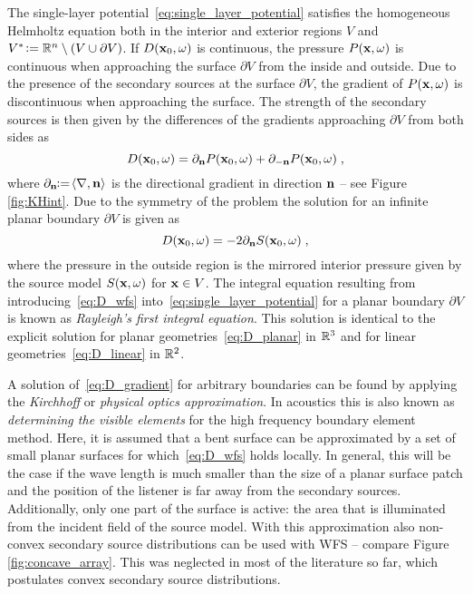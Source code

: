 The single-layer potential~\eqref{eq:single_layer_potential} satisfies the homogeneous
Helmholtz equation
both in the interior and exterior regions $V$ and $V^*
\mathrel{\!\mathop:}= \mathbb{R}^n \setminus (V \cup \partial V)$.  If $D(\mathbf{x}_0,\omega)$ is
continuous, the pressure $P(\mathbf{x},\omega)$ is continuous when approaching the
surface $\partial V$ from the inside and outside.  Due to the presence of the
secondary sources at the surface $\partial V$, the gradient of $P(\mathbf{x},\omega)$ is
discontinuous when approaching the surface.
The strength of the secondary sources is then given by the differences of the
gradients approaching $\partial V$ from both sides
as 
%
\begin{equation}
    D(\x_0,\omega) = \partial_\n
    P(\x_0,\omega) + \partial_{-\n} P(\x_0,\omega)\qc
    \label{eq:D_gradient}
\end{equation}
%
where
$\partial_{\mathbf{n}}\!\mathrel{\!\mathop:}=\!\langle\nabla,\mathbf{n}\rangle$ is the directional gradient
in direction $\mathbf{n}$ -- see Figure\,\ref{fig:KHint}.
Due to the symmetry of the problem the solution for an infinite planar
boundary $\partial V$ is given as 
%
\begin{equation}
    D(\x_0,\omega) = -2 \partial_\n S(\x_0,\omega)\qc
    \label{eq:D_wfs}
\end{equation}
%
where the pressure in the outside region is the mirrored interior pressure given by the
source model $S(\mathbf{x},\omega)$ for $\mathbf{x} \in V$.  The
integral equation resulting from introducing~\eqref{eq:D_wfs}
into~\eqref{eq:single_layer_potential} for a planar boundary $\partial V$ is known as
{\em Rayleigh's first integral equation}. This solution is identical
to the explicit solution for planar geometries~\eqref{eq:D_planar} in $\mathbb{R}^3$ and for
linear geometries~\eqref{eq:D_linear} in $\mathbb{R}^2$.

A solution of~\eqref{eq:D_gradient} for  arbitrary boundaries can be
found by applying the \emph{Kirchhoff} or \emph{physical optics
approximation}.
In acoustics this is also known as \emph{determining the visible elements} for
the high frequency boundary element
method.
Here, it is assumed that a
bent surface can be approximated by a set of small planar surfaces for
which~\eqref{eq:D_wfs} holds locally.  In general, this will be the case if the
wave length is much smaller than the size of a planar surface patch and the
position of the listener is far away from the secondary
sources.
Additionally, only one part of the surface is active: the area that is
illuminated from the incident field of the source model.
\FloatBarrier %
\noindent With this approximation
also non-convex secondary
source distributions can be used with
WFS -- compare
Figure\,\ref{fig:concave_array}.
This was neglected in most of the literature so far, which postulates
convex secondary source
distributions.


